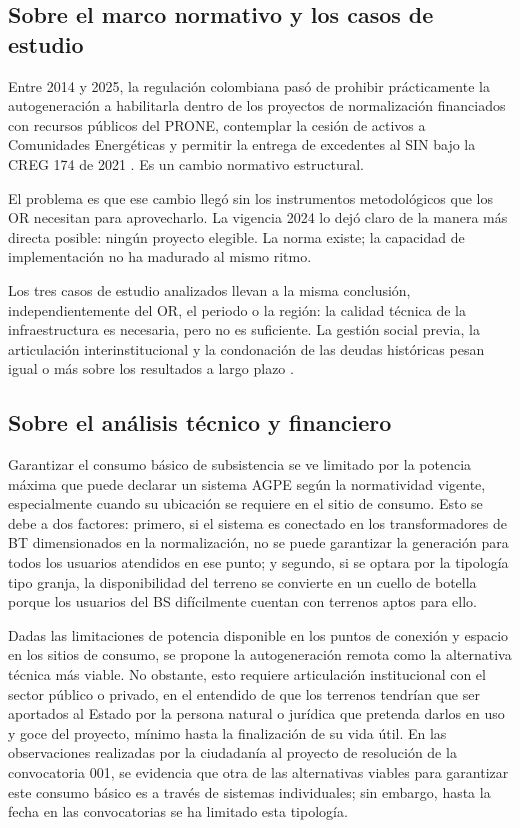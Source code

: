 \subsection{Sobre el marco normativo y los casos de estudio}
\label{subsec:conc_normativo}

Entre 2014 y 2025, la regulación colombiana pasó de prohibir
prácticamente la autogeneración a habilitarla dentro de los proyectos
de normalización financiados con recursos públicos del PRONE, contemplar
la cesión de activos a Comunidades Energéticas y permitir la entrega
de excedentes al SIN bajo la CREG 174 de 2021
\parencite{Ley1715_2014, Decreto1023_2024, ResolucionCREG174_2021}.
Es un cambio normativo estructural.

El problema es que ese cambio llegó sin los instrumentos metodológicos
que los OR necesitan para aprovecharlo. La vigencia 2024 lo dejó claro
de la manera más directa posible: ningún proyecto elegible. La norma
existe; la capacidad de implementación no ha madurado al mismo ritmo.

Los tres casos de estudio analizados llevan a la misma conclusión,
independientemente del OR, el periodo o la región: la calidad técnica
de la infraestructura es necesaria, pero no es suficiente. La gestión
social previa, la articulación interinstitucional y la condonación de
las deudas históricas pesan igual o más sobre los resultados a largo
plazo \parencite{CastilloQuintana1991, MendezFuentes2013,
SerranoRueda2019}.

\subsection{Sobre el análisis técnico y financiero}
\label{subsec:conc_tecnico}

Garantizar el consumo básico de subsistencia se ve limitado por la
potencia máxima que puede declarar un sistema AGPE según la normatividad
vigente, especialmente cuando su ubicación se requiere en el sitio de
consumo. Esto se debe a dos factores: primero, si el sistema es conectado
en los transformadores de BT dimensionados en la normalización, no se
puede garantizar la generación para todos los usuarios atendidos en ese
punto; y segundo, si se optara por la tipología tipo granja, la
disponibilidad del terreno se convierte en un cuello de botella porque
los usuarios del BS difícilmente cuentan con terrenos aptos para ello.

Dadas las limitaciones de potencia disponible en los puntos de conexión
y espacio en los sitios de consumo, se propone la autogeneración remota
como la alternativa técnica más viable. No obstante, esto requiere
articulación institucional con el sector público o privado, en el
entendido de que los terrenos tendrían que ser aportados al Estado por la
persona natural o jurídica que pretenda darlos en uso y goce del
proyecto, mínimo hasta la finalización de su vida útil. En las
observaciones realizadas por la ciudadanía al proyecto de resolución de
la convocatoria 001, se evidencia que otra de las alternativas viables
para garantizar este consumo básico es a través de sistemas
individuales; sin embargo, hasta la fecha en las convocatorias se ha
limitado esta tipología.

